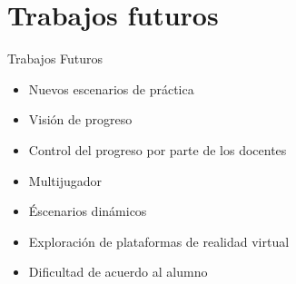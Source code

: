\section{Trabajos futuros}

\begin{frame}{Trabajos Futuros}
    \begin{itemize}[<+->]
        \item Nuevos escenarios de práctica
        \item Visión de progreso
        \item Control del progreso por parte de los docentes
        \item Multijugador
        \item Éscenarios dinámicos
        \item Exploración de plataformas de realidad virtual
        \item Dificultad de acuerdo al alumno
    \end{itemize}
\end{frame}

